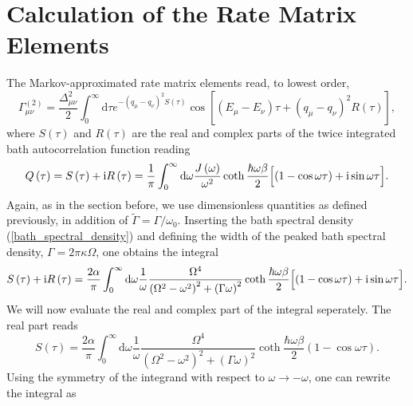 \section{Calculation of the Rate Matrix Elements}

The Markov-approximated rate matrix elements read, to lowest order, 
%
\begin{equation}\label{rate_matrix_elements}
    \Gamma_{\mu\nu}^{(2)} = \frac{\Delta_{\mu\nu}^2}{2} \int_{0}^{\infty} \text{d} \tau 
    e^{- \left( q_\mu - q_\nu \right)^2 S \left( \tau \right)} \cos \left[ \left( E_\mu - E_\nu \right) 
    \tau + \left( q_\mu - q_\nu \right)^2 R \left( \tau \right) \right] ,
\end{equation}
%
where $S(\tau)$ and $R(\tau)$ are the real and complex parts of the twice integrated bath
autocorrelation function reading
%
\begin{equation}
    Q \left( \tau \right) = S \left( \tau \right) + \text{i} R \left( \tau \right) 
    = \frac{1}{\pi} \int_{0}^{\infty} \text{d}\omega \frac{J \left( \omega \right)}{\omega^2}
    \coth\frac{\hbar\omega\beta}{2} \Bigl[ \left( 1-\cos\omega\tau \right) + \text{i}\sin\omega\tau \Bigr].
\end{equation}
%
Again, as in the section before, we use dimensionless quantities as defined previously, 
in addition of $\tilde{\Gamma}=\Gamma/\omega_0$. 
Inserting the bath spectral density (\ref{bath_spectral_density}) and defining
the width of the peaked bath spectral density, $\Gamma = 2 \pi \kappa \Omega$, one obtains the integral
%
\begin{equation}
    S \left( \tau \right) + \text{i} R \left( \tau \right) = \frac{2 \alpha}{\pi} 
    \int_{0}^{\infty} \text{d}\omega \frac{1}{\omega} \frac{\Omega^4}{\left(\Omega^2-\omega^2\right)^2
    + \left(\Gamma\omega\right)^2}
    \coth\frac{\hbar\omega\beta}{2} \Bigl[ \left( 1-\cos\omega\tau \right) + \text{i}\sin\omega\tau \Bigr] .
\end{equation}
%
We will now evaluate the real and complex part of the integral seperately. The real part reads
%
\begin{equation}
    S \left( \tau \right) = \frac{2 \alpha}{\pi} 
    \int_{0}^{\infty} \text{d}\omega \frac{1}{\omega} \frac{\Omega^4}{\left(\Omega^2-\omega^2\right)^2
    + \left(\Gamma\omega\right)^2}
    \coth\frac{\hbar\omega\beta}{2} \left( 1-\cos\omega\tau \right).
\end{equation}
%
Using the symmetry of the integrand with respect to $\omega \rightarrow -\omega$, one can 
rewrite the integral as 
